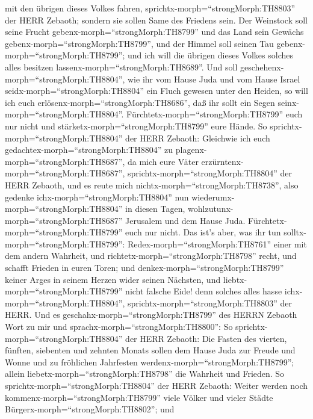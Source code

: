 mit den übrigen dieses Volkes fahren,
sprichtx-morph=``strongMorph:TH8803'' der HERR Zebaoth; 
sondern sie sollen Same des Friedens sein. Der Weinstock soll seine
Frucht gebenx-morph=``strongMorph:TH8799'' und das Land sein Gewächs
gebenx-morph=``strongMorph:TH8799'', und der Himmel soll seinen Tau
gebenx-morph=``strongMorph:TH8799''; und ich will die übrigen dieses
Volkes solches alles besitzen lassenx-morph=``strongMorph:TH8689''.
 Und soll geschehenx-morph=``strongMorph:TH8804'', wie ihr
vom Hause Juda und vom Hause Israel seidx-morph=``strongMorph:TH8804''
ein Fluch gewesen unter den Heiden, so will ich euch
erlösenx-morph=``strongMorph:TH8686'', daß ihr sollt ein Segen
seinx-morph=``strongMorph:TH8804''.
Fürchtetx-morph=``strongMorph:TH8799'' euch nur nicht und
stärketx-morph=``strongMorph:TH8799'' eure Hände.  So
sprichtx-morph=``strongMorph:TH8804'' der HERR Zebaoth: Gleichwie ich
euch gedachtex-morph=``strongMorph:TH8804'' zu
plagenx-morph=``strongMorph:TH8687'', da mich eure Väter
erzürntenx-morph=``strongMorph:TH8687'',
sprichtx-morph=``strongMorph:TH8804'' der HERR Zebaoth, und es reute
mich nichtx-morph=``strongMorph:TH8738'',  also gedenke
ichx-morph=``strongMorph:TH8804'' nun
wiederumx-morph=``strongMorph:TH8804'' in diesen Tagen,
wohlzutunx-morph=``strongMorph:TH8687'' Jerusalem und dem Hause Juda.
Fürchtetx-morph=``strongMorph:TH8799'' euch nur nicht.  Das
ist's aber, was ihr tun solltx-morph=``strongMorph:TH8799'':
Redex-morph=``strongMorph:TH8761'' einer mit dem andern Wahrheit, und
richtetx-morph=``strongMorph:TH8798'' recht, und schafft Frieden in
euren Toren;  und denkex-morph=``strongMorph:TH8799''
keiner Arges in seinem Herzen wider seinen Nächsten, und
liebtx-morph=``strongMorph:TH8799'' nicht falsche Eide! denn solches
alles hasse ichx-morph=``strongMorph:TH8804'',
sprichtx-morph=``strongMorph:TH8803'' der HERR.  Und es
geschahx-morph=``strongMorph:TH8799'' des HERRN Zebaoth Wort zu mir und
sprachx-morph=``strongMorph:TH8800'':  So
sprichtx-morph=``strongMorph:TH8804'' der HERR Zebaoth: Die Fasten des
vierten, fünften, siebenten und zehnten Monats sollen dem Hause Juda zur
Freude und Wonne und zu fröhlichen Jahrfesten
werdenx-morph=``strongMorph:TH8799''; allein
liebetx-morph=``strongMorph:TH8798'' die Wahrheit und Frieden.
 So sprichtx-morph=``strongMorph:TH8804'' der HERR Zebaoth:
Weiter werden noch kommenx-morph=``strongMorph:TH8799'' viele Völker und
vieler Städte Bürgerx-morph=``strongMorph:TH8802'';  und

